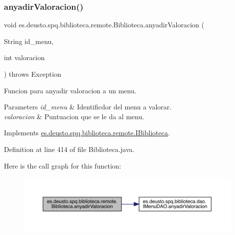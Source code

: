 \subsubsection{\texorpdfstring{anyadir\+Valoracion()}{anyadirValoracion()}}
{\footnotesize\ttfamily void es.\+deusto.\+spq.\+biblioteca.\+remote.\+Biblioteca.\+anyadir\+Valoracion (\begin{DoxyParamCaption}\item[{String}]{id\+\_\+menu,  }\item[{int}]{valoracion }\end{DoxyParamCaption}) throws Exception}

Funcion para anyadir valoracion a un menu. 
\begin{DoxyParams}{Parameters}
{\em id\+\_\+menu} & Identificdor del menu a valorar. \\
\hline
{\em valoracion} & Puntuacion que se le da al menu. \\
\hline
\end{DoxyParams}


Implements \mbox{\hyperlink{interfacees_1_1deusto_1_1spq_1_1biblioteca_1_1remote_1_1_i_biblioteca_a72b9d5541556bacfdfb37f47753972c1}{es.\+deusto.\+spq.\+biblioteca.\+remote.\+I\+Biblioteca}}.



Definition at line 414 of file Biblioteca.\+java.

Here is the call graph for this function\+:
\nopagebreak
\begin{figure}[H]
\begin{center}
\leavevmode
\includegraphics[width=350pt]{classes_1_1deusto_1_1spq_1_1biblioteca_1_1remote_1_1_biblioteca_a8657b2e8a0f290b26854518289c4b977_cgraph}
\end{center}
\end{figure}
\mbox{\label{classes_1_1deusto_1_1spq_1_1biblioteca_1_1remote_1_1_biblioteca_a5d8bbdd7819a301e1a7bfee2795b9040}} 
